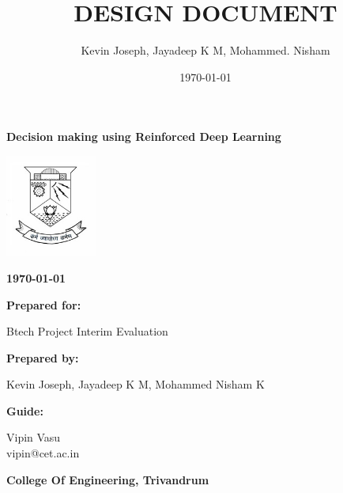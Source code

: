 \documentclass[twoside,letterpaper]{article}
\title{DESIGN DOCUMENT}
\author{Kevin Joseph, Jayadeep K M, Mohammed. Nisham}
\date{\today}
\begin{document}
\nocite{*}



\bigskip

{\centering{}\bfseries\color{black}
Decision making using Reinforced Deep Learning
\par}


\bigskip

\centering
\includegraphics[width=3cm]{images/logo.jpg}

\bigskip

{\centering{}\bfseries\color{black}
\today
\par}


\bigskip


\bigskip

{\centering{}\bfseries\color{black}
Prepared for:
\par}

{\centering{}\color{black}
Btech Project Interim Evaluation
\par}


\bigskip


\bigskip

{\centering{}\bfseries\color{black}
Prepared by:
\par}

{\centering{}\color{black}
Kevin Joseph, Jayadeep K M, Mohammed Nisham K
\par}
\bigskip
{\centering{}\bfseries\color{black}
Guide:
\par}

{\centering{}\color{black}
Vipin Vasu\\
vipin@cet.ac.in\\
\par}
\bigskip
{\bfseries\color{black}
College Of Engineering, Trivandrum
\par}

\end{document}
